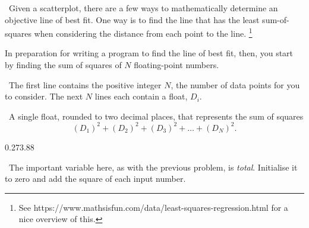 

\Question\ Given a scatterplot, there are a few ways to mathematically determine an
objective line of best fit. One way is to find the line that has the least sum-of-squares
when considering the distance from each point to the line.%
\footnote{See https://www.mathsisfun.com/data/least-squares-regression.html for a nice
overview of this.}

In preparation for writing a program to find the line of best fit, then, you start by
finding the sum of squares of $N$ floating-point numbers.

\Input\ The first line contains the positive integer $N$, the number of data points for
you to consider. The next $N$ lines each contain a float, $D_i$.

\Output\ A single float, rounded to two decimal places, that represents the sum of squares
\[
  (D_1)^2 + (D_2)^2 + (D_3)^2 + \dots + (D_N)^2.
\]

\Sample

       {0.2}{73.88}

\Scratch\ The important variable here, as with the previous problem, is \emph{total}.
Initialise it to zero and add the square of each input number.
